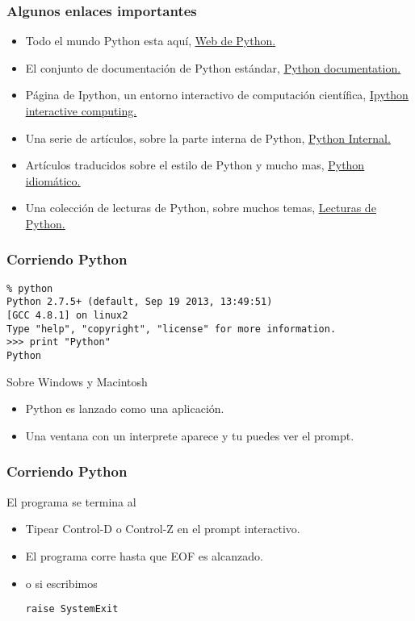 \documentclass[10pt]{beamer}
\begin{document}
\begin{frame}[fragile]
\frametitle{Algunos enlaces importantes}

\begin{itemize}
\item Todo el mundo Python esta aqu\'i, \href{http://www.python.org}{\underline{Web de Python.}}
\item El conjunto de documentaci\'on de Python est\'andar, \href{http://www.python.org/doc/}{\underline{Python documentation.}} 
\item P\'agina de Ipython, un entorno interactivo de computaci\'on cient\'ifica, 
\href{http://ipython.org/}{\underline{Ipython interactive computing.}}
\item Una serie de art\'iculos, sobre la parte interna de Python, \href{http://tech.blog.aknin.name/2010/04/02/pythons-innards-introduction/}{\underline{Python Internal.}}
\item Art\'iculos traducidos sobre el estilo de Python y mucho mas, \href{http://mundogeek.net/traducidos/}{\underline{Python idiom\'atico.}}
\item Una colecci\'on de lecturas de Python, sobre muchos temas, \href{http://jessenoller.com/good-to-great-python-reads/}{\underline{Lecturas de Python.}}

\end{itemize}


\end{frame}



\begin{frame}[fragile]
\frametitle{Corriendo Python}
\begin{lstlisting}
% python
Python 2.7.5+ (default, Sep 19 2013, 13:49:51) 
[GCC 4.8.1] on linux2
Type "help", "copyright", "license" for more information.
>>> print "Python"
Python
\end{lstlisting}


\vspace{0.3cm}

Sobre Windows y Macintosh

\begin{itemize}
\item Python es lanzado como una aplicaci\'on.
\item Una ventana con un interprete aparece y tu puedes ver el prompt.
\end{itemize}
\end{frame}

\begin{frame}[fragile]
\frametitle{Corriendo Python}
El programa se termina al  

\begin{itemize}
\item Tipear Control-D o Control-Z en el prompt interactivo.
\item El programa corre hasta que EOF es alcanzado.
\item o si escribimos
\begin{lstlisting}
raise SystemExit
\end{lstlisting}
\end{itemize}
\end{frame}
\end{document}
